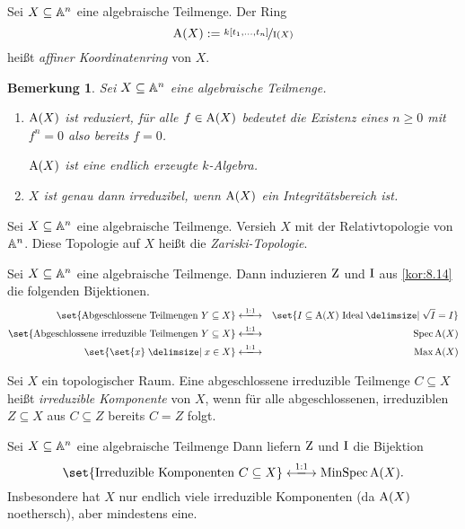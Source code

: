 \documentclass[12pt,a4paper]{scrartcl}
\theoremstyle{cplain}
\theoremstyle{cdef}
\newtheorem{beme}[thmcounter]{Bemerkung}
\begin{document}
\begin{defi}
	Sei $X\subseteq \mathbb A^n$ eine algebraische Teilmenge. Der Ring
	\[\operatorname{A}(X) := \nicefrac{k[t_1,\dots, t_n]}{\operatorname{I}(X)}\]
	heißt \emph{affiner Koordinatenring} von $X$.
	
\end{defi}
\begin{beme}
	Sei $X\subseteq \mathbb A^n$ eine algebraische Teilmenge.
	\begin{enumerate}
		\item $\operatorname{A}(X)$ ist \emph{reduziert}, für alle $f\in \operatorname{A}(X)$ bedeutet die Existenz eines $n\ge 0$ mit $f^n = 0$ also bereits $f = 0$.
		
		$\operatorname{A}(X)$ ist eine endlich erzeugte $k$-Algebra.
		\item $X$ ist genau dann irreduzibel, wenn $\operatorname{A}(X)$ ein Integritätsbereich ist.
	\end{enumerate}
\end{beme}
\begin{defi}
	Sei $X\subseteq \mathbb A^n$ eine algebraische Teilmenge. Versieh $X$ mit der Relativtopologie von $\mathbb A^n$. Diese Topologie auf $X$ heißt die \emph{Zariski-Topologie}.
\end{defi}
\begin{kor}
	Sei $X\subseteq\mathbb A^n$ eine algebraische Teilmenge. Dann induzieren $\operatorname{Z}$ und $\operatorname{I}$ aus \cref{kor:8.14} die folgenden Bijektionen.
	\begin{eqnarray*}
		\set{\text{Abgeschlossene Teilmengen }Y\subseteq X} &\xlongleftrightarrow{1:1}&\set{I\subseteq \A(X) \text{ Ideal}\given \sqrt{I} = I}\\
		\set{\text{Abgeschlossene irreduzible Teilmengen }Y\subseteq X}&\xlongleftrightarrow{1:1}&\Spec \A(X)\\
		\set{\set{x}\given x\in X}&\xlongleftrightarrow{1:1}&\Max \A(X)
	\end{eqnarray*}
\end{kor}
\begin{defi}
	Sei $X$ ein topologischer Raum. Eine abgeschlossene irreduzible Teilmenge $C\subseteq X$ heißt \emph{irreduzible Komponente} von $X$, wenn für alle abgeschlossenen, irreduziblen $Z\subseteq X$ aus $C\subseteq Z$ bereits $C = Z$ folgt.
\end{defi}
\begin{kor}
	Sei $X\subseteq \mathbb A^n$ eine algebraische Teilmenge Dann liefern $\operatorname{Z}$ und $\operatorname{I}$ die Bijektion
	\[\set{\text{Irreduzible Komponenten }C\subseteq X}\xlongleftrightarrow{1:1} \MinSpec\A(X).\]
	Insbesondere hat $X$ nur endlich viele irreduzible Komponenten (da $\operatorname{A}(X)$ noethersch), aber mindestens eine.
\end{kor}
\end{document}
